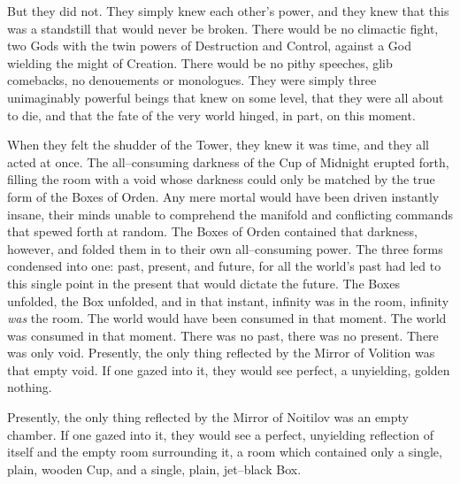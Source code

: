 But they did not. They simply knew each other’s power, and they knew that this was a standstill that would never be broken. There would be no climactic fight, two Gods with the twin powers of Destruction and Control, against a God wielding the might of Creation. There would be no pithy speeches, glib comebacks, no denouements or monologues. They were simply three unimaginably powerful beings that knew on some level, that they were all about to die, and that the fate of the very world hinged, in part, on this moment.

When they felt the shudder of the Tower, they knew it was time, and they all acted at once.
\SmallVSpace
The all\mbox{--}consuming darkness of the Cup of Midnight erupted forth, filling the room with a void whose darkness could only be matched by the true form of the Boxes of Orden. Any mere mortal would have been driven instantly insane, their minds unable to comprehend the manifold and conflicting commands that spewed forth at random.
\SmallVSpace
The Boxes of Orden contained that darkness, however, and folded them in to their own all\mbox{--}consuming power. The three forms condensed into one: past, present, and future, for all the world’s past had led to this single point in the present that would dictate the future. The Boxes unfolded, the Box unfolded, and in that instant, infinity was in the room, infinity \emph{was} the room.
\SmallVSpace
The world would have been consumed in that moment. The world was consumed in that moment. There was no past, there was no present. There was only void.
\SmallVSpace
Presently, the only thing reflected by the Mirror of Volition was that empty void. If one gazed into it, they would see perfect, a unyielding, golden nothing.

Presently, the only thing reflected by the Mirror of Noitilov was an empty chamber. If one gazed into it, they would see a perfect, unyielding reflection of itself and the empty room surrounding it, a room which contained only a single, plain, wooden Cup, and a single, plain, jet\mbox{--}black Box.
\simpleline	
{}
\simpleline	
{}

